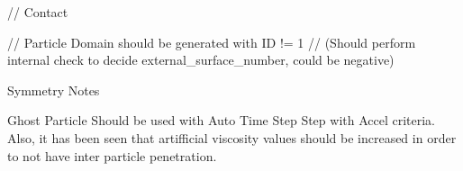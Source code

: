 


// Contact 

// Particle Domain should be generated with ID != 1
// (Should perform internal check to decide external_surface_number, could be negative) 

Symmetry Notes

Ghost Particle Should be used with Auto Time Step Step with Accel criteria.
Also, it has been seen that artifficial viscosity values should be increased in order to 
not have inter particle penetration.